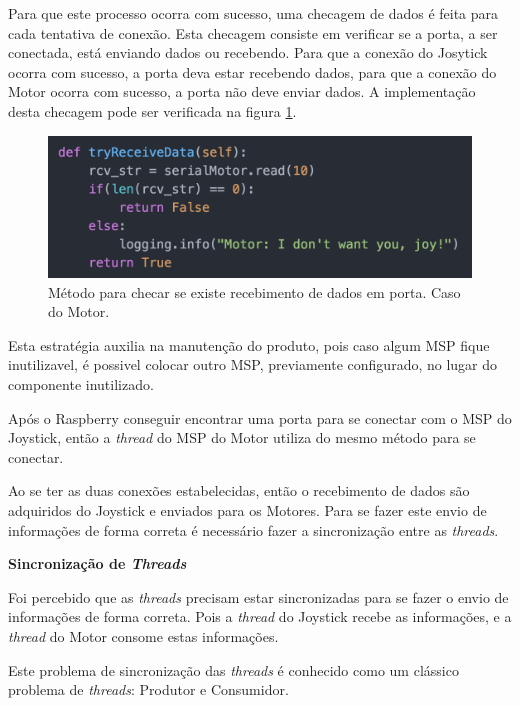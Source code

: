   Para que este processo ocorra com sucesso, uma checagem de dados é feita para cada tentativa de conexão. Esta checagem consiste em verificar se a porta, a ser conectada, está enviando dados ou recebendo. Para que a conexão do Josytick ocorra com sucesso, a porta deva estar recebendo dados, para que a conexão do Motor ocorra com sucesso, a porta não deve enviar dados. A implementação desta checagem pode ser verificada na figura \ref{fig:try_receive_data}.

  \begin{figure}[!htb]
  \centering
  \includegraphics[keepaspectratio=true,scale=0.5]{figuras/resultados/try_receive_data}
  \caption{Método para checar se existe recebimento de dados em porta. Caso do Motor.}
  \label{fig:try_receive_data}
  \end{figure}

  Esta estratégia auxilia na manutenção do produto, pois caso algum MSP fique inutilizavel, é possivel colocar outro MSP, previamente configurado, no lugar do componente inutilizado.

  Após o Raspberry conseguir encontrar uma porta para se conectar com o MSP do Joystick, então a \textit{thread} do MSP do Motor utiliza do mesmo método para se conectar.

  Ao se ter as duas conexões estabelecidas, então o recebimento de dados são adquiridos do Joystick e enviados para os Motores. Para se fazer este envio de informações de forma correta é necessário fazer a sincronização entre as \textit{threads}.

  \textbf{Sincronização de \textit{Threads}}

  Foi percebido que as \textit{threads} precisam estar sincronizadas para se fazer o envio de informações de forma correta. Pois a \textit{thread} do Joystick recebe as informações, e a \textit{thread} do Motor consome estas informações.

  Este problema de sincronização das \textit{threads} é conhecido como um clássico problema de \textit{threads}: Produtor e Consumidor.

